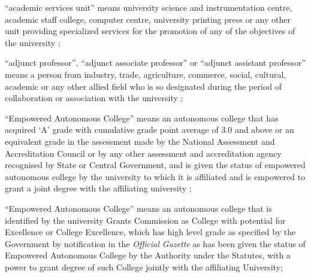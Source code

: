 \documentclass[reprint]{mhact}
\begin{document}
      \begin{subsectionlist}
    

``academic services unit'' means university science and instrumentation centre, academic staff college, computer centre, university printing press or any other unit providing specialized services for the promotion of any of the objectives of the university ;


``adjunct professor'', ``adjunct associate professor'' or ``adjunct assistant professor'' means a person from industry, trade, agriculture, commerce, social, cultural, academic or any other allied field who is so designated during the period of collaboration or association with the university ;


``Empowered Autonomous College'' means an autonomous college that has acquired `A' grade with cumulative grade point average of 3.0 and above or an equivalent grade in the assessment made by the National Assessment and Accreditation Council or by any other assessment and accreditation agency recognised by State or Central Government, and is given the status of empowered autonomous college by the university to which it is affiliated and is empowered to grant a joint degree with the affiliating university ;


``Empowered Autonomous College'' means an autonomous college that is identified by the university Grants Commission as College with potential for Excellence or College Excellence, which has high level grade as specified by the Government by notification in the \emph{Official Gazette} as has been given the status of Empowered Autonomous College by the Authority under the Statutes, with a power to grant degree of such College jointly with the affiliating University;





       \end{subsectionlist}
\end{document}
